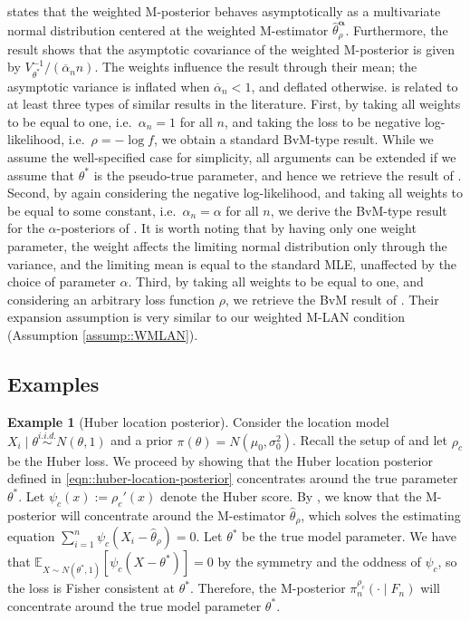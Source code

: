 \documentclass[11pt, oneside]{amsart}
\theoremstyle{definition}   %
\newtheorem{example}{Example}
\newcommand{\E}{\mathbb{E}}
\newcommand{\loss}{\rho}
\newcommand{\mestimator}{\hat{\theta}^{\boldsymbol{\alpha}}_{\loss }}
\begin{document}
%
 states that the weighted M-posterior behaves asymptotically as a multivariate normal distribution centered at the weighted M-estimator \( \mestimator \).
%
Furthermore, the result shows that the asymptotic covariance of the weighted M-posterior is given by  \( V_{\theta^*}^{-1} / (\overline{\alpha}_n n) \).
%
The weights influence the result through their mean; the asymptotic variance is inflated when \( \overline{\alpha}_n < 1 \), and deflated otherwise.
%
  is related to at least three types of similar results in the literature. 
%
First, by taking all weights to be equal to one, i.e.\ \( \alpha_n = 1 \) for all \( n\), and taking the loss to be negative log-likelihood, i.e.\ \( \rho = -\log f\), we obtain a standard BvM-type result. While we assume the well-specified case for simplicity, all arguments can be extended if we assume that \( \theta^*\) is the pseudo-true parameter, and hence we retrieve the result of \cite{kleijn:vandervaart2012}.
%
Second, by again considering the negative log-likelihood, and taking all weights to be equal to some constant, i.e.\ \( \alpha_n = \alpha \) for all \( n\), we derive the BvM-type result for the \( \alpha \)-posteriors of \cite{avellamedinaetal2021}. It is worth noting that by having only one weight parameter, the weight affects the limiting normal distribution only through the variance, and the limiting mean is equal to the standard MLE, unaffected by the choice of parameter \( \alpha \).
%
Third, by taking all weights to be equal to one, and considering an arbitrary loss function \( \rho \), we retrieve the BvM result of \cite{chernozhukov:hong2003}. Their expansion assumption is very similar to our weighted M-LAN condition (Assumption \ref{assump::WMLAN}).

\subsection{Examples}

\begin{example}[Huber location posterior]
    Consider the location model \(X_i \mid \theta \overset{i.i.d.}{\sim} N(\theta,1)\) and a prior \( \pi(\theta)=N(\mu_0,\sigma_0^2)\).
    Recall the setup of  and let \( \loss_c \) be the Huber loss. 
    We proceed by showing that the Huber location posterior defined in \eqref{eqn::huber-location-posterior} concentrates around the true parameter \( \theta^* \). Let \( \psi_c(x):=\loss_c'(x) \) denote the Huber score. 
    By , we know that the M-posterior will concentrate around the M-estimator \( \hat{\theta}_\loss\), which solves the estimating equation
    $\sum_{i=1}^n \psi_c(X_i - \hat{\theta}_\loss) = 0.$
    Let \( \theta^* \) be the true model parameter. We have that
    \(
        \E_{X \sim N(\theta^*, 1)} [\psi_c  ( X-\theta^*  ) ]=0
    \)
    by the symmetry and the oddness of \( \psi_c \),
    so the loss is Fisher consistent at \( \theta^* \). Therefore, the M-posterior \( \pi^{\loss_c}_{n} (\cdot \mid F_n)\) will concentrate around the true model parameter \( \theta^* \).
\end{example}
\end{document}
